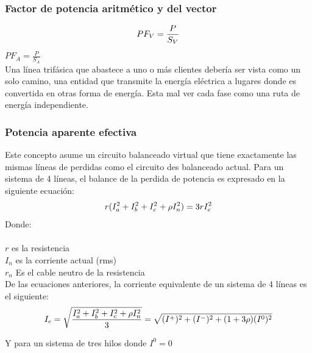 \subsubsection{Factor de potencia aritmético y del vector }

\begin{equation}\label{EQ54}
PF_{V}=\frac{P}{S_{V}}\\
\end{equation}
$PF_{A}=\frac{P}{S_{A}}$\\

Una línea trifásica que abastece a uno o más clientes debería ser vista como un solo camino, una entidad que transmite la energía eléctrica a lugares donde es convertida en otras forma de energía. Esta mal ver cada fase como una ruta de energía independiente.\cite{A30}\\

\subsubsection{Potencia aparente efectiva}

Este concepto asume un circuito balanceado virtual que tiene exactamente las mismas líneas de perdidas como el circuito des balanceado actual. Para un sistema de 4 líneas, el balance de la perdida de potencia es expresado en la siguiente ecuación:\cite{A30}\\

\begin{equation}\label{EQ55}
r(I^2_{a}+I^2_{b}+I^2_{c}+\rho I^2_{n})=3rI^2_{e}\\
\end{equation}
Donde:\\\\
$r$			es la resistencia\\
$I_{n}$		es la corriente actual (rms)\\
$r_{n}$		Es el cable neutro de la resistencia\\

De las ecuaciones anteriores, la corriente equivalente de un sistema de 4 líneas es el siguiente:\\

\begin{equation}\label{EQ56}
I_{e}=\sqrt{\frac{I^2_{a}+I^2_{b}+I^2_{c}+\rho I^2_{n}}{3}}=\sqrt{(I^+)^2+(I^-)^2+(1+3\rho)(I^0)^2}\\
\end{equation}

Y para un sistema de tres hilos donde $I^0=0$\\

